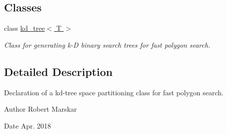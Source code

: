 \subsection*{Classes}
\begin{DoxyCompactItemize}
\item 
class \hyperlink{classkd__tree}{kd\+\_\+tree$<$ T $>$}
\begin{DoxyCompactList}\small\item\em Class for generating k-\/D binary search trees for fast polygon search. \end{DoxyCompactList}\end{DoxyCompactItemize}


\subsection{Detailed Description}
Declaration of a kd-\/tree space partitioning class for fast polygon search. 

\begin{DoxyAuthor}{Author}
Robert Marskar 
\end{DoxyAuthor}
\begin{DoxyDate}{Date}
Apr. 2018 
\end{DoxyDate}
